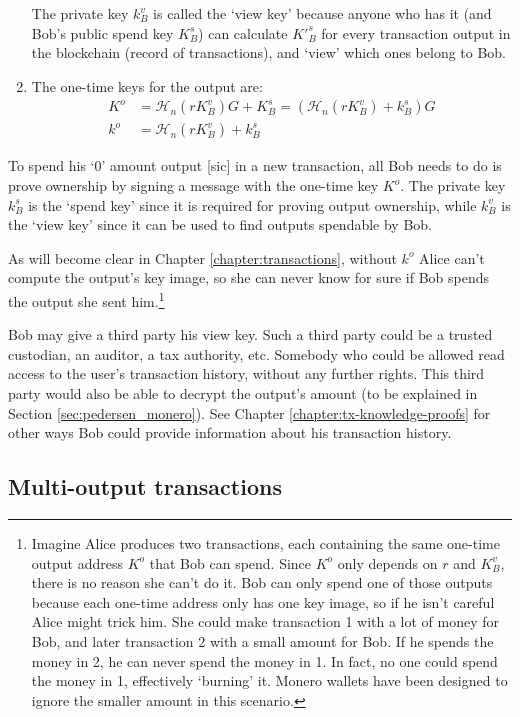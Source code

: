 \begin{enumerate}
	The private key $k_B^v$ is called the `view key' because anyone who has it (and Bob’s public spend key $K_B^s$) can calculate $K'^s_B$ for every transaction output in the blockchain (record of transactions), and ‘view’ which ones belong to Bob.

	\item The one-time keys for the output are:\vspace{.175cm}
	\begin{align*}
		K^o &= \mathcal{H}_n(r K_B^v)G + K_B^s = (\mathcal{H}_n(r K_B^v) + k_B^s)G  \\ 
		k^o &= \mathcal{H}_n(r K_B^v) + k_B^s
	\end{align*}
\end{enumerate}

To spend his `0' amount output [sic] in a new transaction, all Bob needs to do is prove ownership by signing a message with the one-time key $K^o$. The private key $k_B^s$ is the `spend key' since it is required for proving output ownership, while $k_B^v$ is the `view key' since it can be used to find outputs spendable by Bob.

As will become clear in Chapter \ref{chapter:transactions}, without $k^o$ Alice can't compute the output's key image, so she can never know for sure if Bob spends the output she sent him.\footnote{Imagine Alice produces two transactions, each containing the same one-time output address $K^o$ that Bob can spend. Since $K^o$ only depends on $r$ and $K_B^v$, there is no reason she can't do it. Bob can only spend one of those outputs because each one-time address only has one key image, so if he isn't careful Alice might trick him. She could make transaction 1 with a lot of money for Bob, and later transaction 2 with a small amount for Bob. If he spends the money in 2, he can never spend the money in 1. In fact, no one could spend the money in 1, effectively `burning' it. Monero wallets have been designed to ignore the smaller amount in this scenario.}

Bob may give a third party his view key. Such a third party could be a trusted custodian, an auditor, a tax authority, etc. Somebody who could be allowed read access to the user’s transaction history, without any further rights. This third party would also be able to decrypt the output's amount (to be explained in Section \ref{sec:pedersen_monero}). See Chapter \ref{chapter:tx-knowledge-proofs} for other ways Bob could provide information about his transaction history.


\subsection{Multi-output transactions}
\label{sec:multi_out_transactions}

